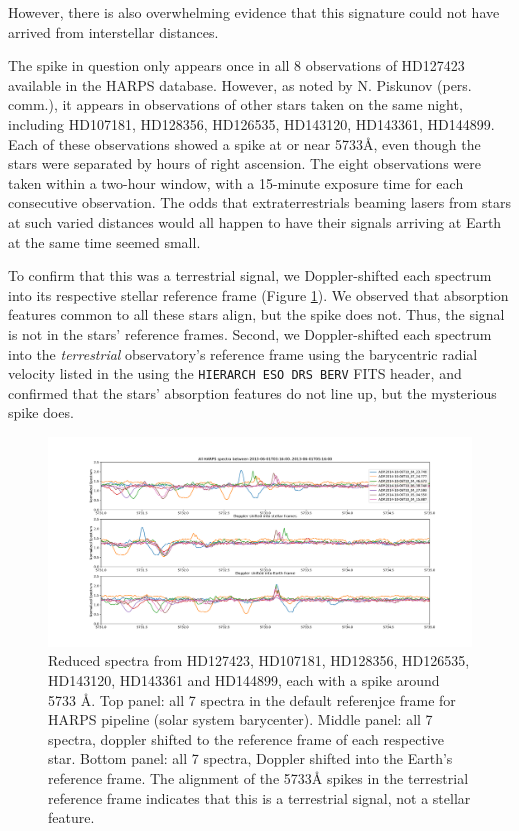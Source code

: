 \documentclass[linenumbers]{aastex631}
\begin{document}
However, there is also overwhelming evidence that this signature could not have arrived from interstellar distances.  

The spike in question only appears once in all 8 observations of HD127423 available in the HARPS database.  However, as noted by N. Piskunov (pers. comm.), it appears in observations of other stars taken on the same night, including HD107181, HD128356, HD126535, HD143120, HD143361, HD144899.  Each of these observations showed a spike at or near 5733\AA, even though the stars were separated by hours of right ascension. The eight observations were taken within a two-hour window, with a 15-minute exposure time for each consecutive observation. The odds that extraterrestrials beaming lasers from stars at such varied distances would all happen to have their signals arriving at Earth at the same time seemed small. 

To confirm that this was a terrestrial signal, we Doppler-shifted each spectrum into its respective stellar reference frame (Figure \ref{fig:stellarframespectra}).  We observed that absorption features common to all these stars align, but the spike does not. Thus, the signal is not in the stars' reference frames.  Second, we Doppler-shifted each spectrum into the {\em terrestrial} observatory's reference frame using the barycentric radial velocity listed in the using the \texttt{HIERARCH ESO DRS BERV} FITS header, and confirmed that the stars' absorption features do not line up, but the mysterious spike does.

\begin{figure}
    \centering
    \includegraphics[width=\textwidth]{HD127423Dopplershift.pdf}
    \caption{Reduced spectra from HD127423, HD107181, HD128356, HD126535, HD143120, HD143361 and HD144899, each with a spike around 5733 \AA. Top panel: all 7 spectra in the default referenjce frame for HARPS pipeline (solar system barycenter). Middle panel: all 7 spectra, doppler shifted to the reference frame of each respective star. Bottom panel: all 7 spectra, Doppler shifted into the Earth's reference frame.  The alignment of the 5733{\AA} spikes in the terrestrial reference frame indicates that this is a terrestrial signal, not a stellar feature.}
    \label{fig:stellarframespectra}
\end{figure}
\end{document}
